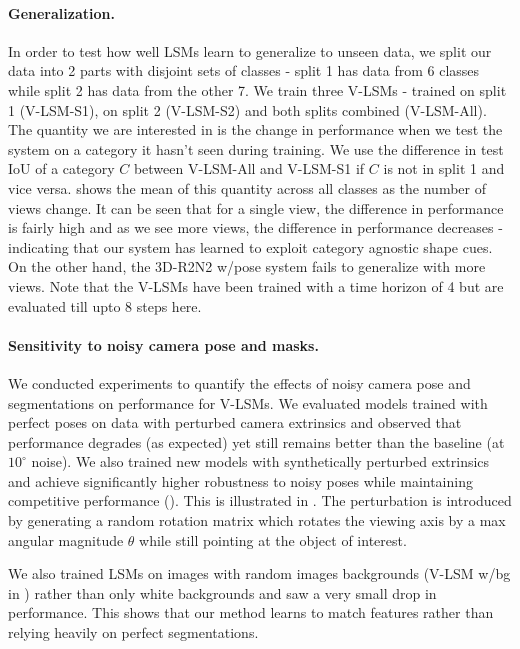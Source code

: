 \documentclass[../thesis.tex]{subfiles}
\begin{document}
\paragraph{Generalization.}
In order to test how well LSMs learn to generalize to unseen data, we split our data into 2 parts with disjoint sets of classes - split 1 has data from 6 classes while split 2 has data from the other 7. We train three V-LSMs - trained on split 1 (V-LSM-S1), on split 2 (V-LSM-S2) and both splits combined (V-LSM-All). The quantity we are interested in is the change in performance when we test the system on a category it hasn't seen during training. We use the difference in test IoU of a category $C$ between V-LSM-All and V-LSM-S1 if $C$ is not in split 1 and vice versa.  shows the mean of this quantity across all classes as the number of views change. It can be seen that for a single view, the difference in performance is fairly high and as we see more views, the difference in performance decreases - indicating that our system has learned to exploit category agnostic shape cues. On the other hand, the 3D-R2N2 w/pose system fails to generalize with more views. Note that the V-LSMs have been trained with a time horizon of 4 but are evaluated till upto 8 steps here.

\paragraph{Sensitivity to noisy camera pose and masks.}

We conducted experiments to quantify the effects of noisy camera pose and segmentations on performance for V-LSMs. We evaluated models trained with perfect poses on data with perturbed camera extrinsics and observed that performance degrades (as expected) yet still remains better than the baseline (at $10^\circ$  noise). We also trained new models with synthetically perturbed extrinsics and achieve significantly higher robustness to noisy poses while maintaining competitive performance (). This is illustrated in . The perturbation is introduced by generating a random rotation matrix which rotates the viewing axis by a max angular magnitude $\theta$ while still pointing at the object of interest.

We also trained LSMs on images with random images backgrounds (V-LSM w/bg in ) rather than only white backgrounds and saw a very small drop in performance. This shows that our method learns to match features rather than relying heavily on perfect segmentations.
\end{document}
